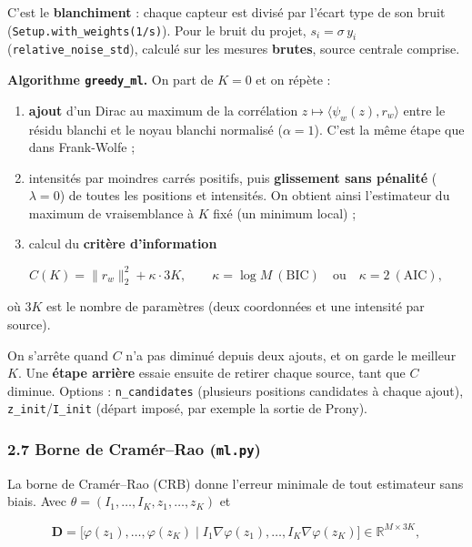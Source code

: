 \documentclass[
  french,
]{article}
\providecommand{\tightlist}{%
  \setlength{\itemsep}{0pt}\setlength{\parskip}{0pt}}
\begin{document}
C'est le \textbf{blanchiment} : chaque capteur est divisé par l'écart
type de son bruit (\texttt{Setup.with\_weights(1/s)}). Pour le bruit du
projet, \(s_i = \sigma\,y_i\) (\texttt{relative\_noise\_std}), calculé
sur les mesures \textbf{brutes}, source centrale comprise.

\textbf{Algorithme \texttt{greedy\_ml}.} On part de \(K = 0\) et on
répète :

\begin{enumerate}
\def\labelenumi{\arabic{enumi}.}
\tightlist
\item
  \textbf{ajout} d'un Dirac au maximum de la corrélation
  \(z\mapsto\langle\psi_w(z), r_w\rangle\) entre le résidu blanchi et le
  noyau blanchi normalisé (\(\alpha = 1\)). C'est la même étape que dans
  Frank-Wolfe ;
\item
  intensités par moindres carrés positifs, puis \textbf{glissement sans
  pénalité} (\(\lambda = 0\)) de toutes les positions et intensités. On
  obtient ainsi l'estimateur du maximum de vraisemblance à \(K\) fixé
  (un minimum local) ;
\item
  calcul du \textbf{critère d'information}
\end{enumerate}

\[
C(K) = \big\lVert r_w\big\rVert_2^2 + \kappa\cdot 3K,
\qquad \kappa = \log M \ (\text{BIC}) \quad\text{ou}\quad \kappa = 2 \ (\text{AIC}),
\]

où \(3K\) est le nombre de paramètres (deux coordonnées et une intensité
par source).

On s'arrête quand \(C\) n'a pas diminué depuis deux ajouts, et on garde
le meilleur \(K\). Une \textbf{étape arrière} essaie ensuite de retirer
chaque source, tant que \(C\) diminue. Options : \texttt{n\_candidates}
(plusieurs positions candidates à chaque ajout),
\texttt{z\_init}/\texttt{I\_init} (départ imposé, par exemple la sortie
de Prony).

\subsubsection{\texorpdfstring{2.7 Borne de Cramér--Rao
(\texttt{ml.py})}{2.7 Borne de Cramér--Rao (ml.py)}}\label{borne-de-cramuxe9rrao-ml.py}

La borne de Cramér--Rao (CRB) donne l'erreur minimale de tout estimateur
sans biais. Avec \(\theta = (I_1,\dots,I_K, z_1,\dots,z_K)\) et

\[
\mathbf{D} = \Big[\varphi(z_1),\dots,\varphi(z_K)\;\Big\vert\;I_1\nabla\varphi(z_1),\dots,I_K\nabla\varphi(z_K)\Big]\in\mathbb{R}^{M\times 3K},
\]
\end{document}
